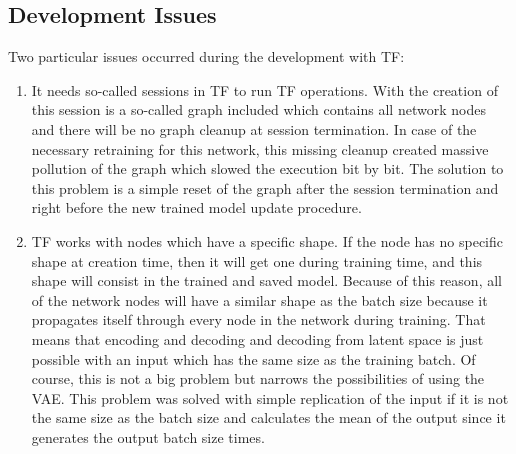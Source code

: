 \documentclass[MGS,Master,english]{twbook}%
\begin{document}
\subsection{Development Issues}
Two particular issues occurred during the development with TF:
\begin{enumerate}
	\item It needs so-called sessions in TF to run TF operations. With the creation of this session is a so-called graph included which contains all network nodes and there will be no graph cleanup at session termination. In case of the necessary retraining for this network, this missing cleanup created massive pollution of the graph which slowed the execution bit by bit. The solution to this problem is a simple reset of the graph after the session termination and right before the new trained model update procedure.
	\item TF works with nodes which have a specific shape.  If the node has no specific shape at creation time, then it will get one during training time, and this shape will consist in the trained and saved model. Because of this reason, all of the network nodes will have a similar shape as the batch size because it propagates itself through every node in the network during training. That means that encoding and decoding and decoding from latent space is just possible with an input which has the same size as the training batch. Of course, this is not a big problem but narrows the possibilities of using the VAE. This problem was solved with simple replication of the input if it is not the same size as the batch size and calculates the mean of the output since it generates the output batch size times.
\end{enumerate}
\end{document}
